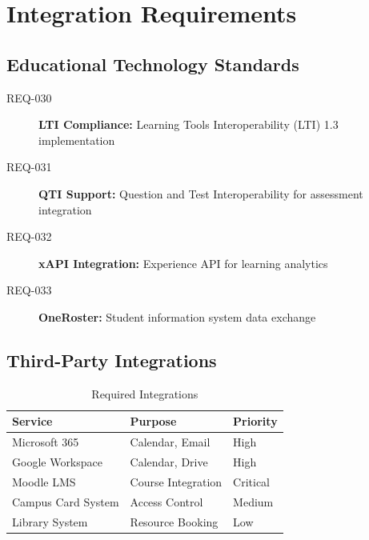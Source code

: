 \documentclass[11pt, a4paper]{article}
\begin{document}
\section{Integration Requirements}
\label{sec:integration}

\subsection{Educational Technology Standards}
\label{sec:edtech_standards}

\begin{requirementbox}[title=Standards Compliance]
\begin{description}
    \item[REQ-030] \textbf{LTI Compliance:} Learning Tools Interoperability (LTI) 1.3 implementation
    \item[REQ-031] \textbf{QTI Support:} Question and Test Interoperability for assessment integration
    \item[REQ-032] \textbf{xAPI Integration:} Experience API for learning analytics
    \item[REQ-033] \textbf{OneRoster:} Student information system data exchange
\end{description}
\end{requirementbox}

\subsection{Third-Party Integrations}
\label{sec:third_party}

\begin{table}[h]
\centering
\caption{Required Integrations}
\begin{tabular}{@{}lll@{}}
\toprule
\textbf{Service} & \textbf{Purpose} & \textbf{Priority} \\
\midrule
Microsoft 365 & Calendar, Email & High \\
Google Workspace & Calendar, Drive & High \\
Moodle LMS & Course Integration & Critical \\
Campus Card System & Access Control & Medium \\
Library System & Resource Booking & Low \\
\bottomrule
\end{tabular}
\end{table}

\end{document}
